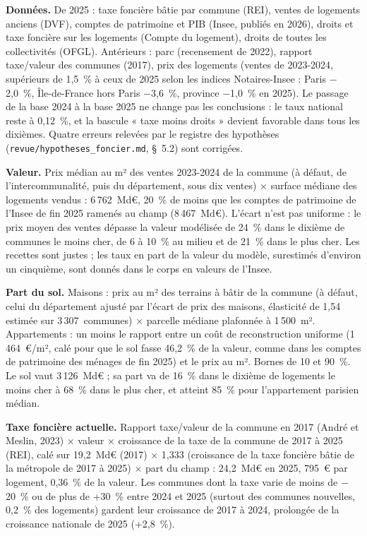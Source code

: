 \documentclass[11pt,a4paper]{article}
\begin{document}
\textbf{Données.} De 2025 : taxe foncière bâtie par commune (REI), ventes de logements anciens (DVF), comptes de
patrimoine et PIB (Insee, publiés en 2026), droits et taxe foncière sur les logements (Compte du logement), droits de
toutes les collectivités (OFGL). Antérieurs : parc (recensement de 2022), rapport taxe/valeur des communes (2017), prix
des logements (ventes de 2023-2024, supérieurs de 1,5~\% à ceux de 2025 selon les indices Notaires-Insee : Paris
$-$2,0~\%, Île-de-France hors Paris $-$3,6~\%, province $-$1,0~\% en 2025). Le passage de la base 2024 à la base 2025 ne
change pas les conclusions : le taux national reste à 0,12~\%, et la bascule « taxe moins droits » devient favorable dans
tous les dixièmes. Quatre erreurs relevées par le registre des hypothèses (\texttt{revue/hypotheses\_foncier.md},
§~5.2) sont corrigées.

\textbf{Valeur.} Prix médian au m² des ventes 2023-2024 de la commune (à défaut, de l'intercommunalité, puis du
département, sous dix ventes) × surface médiane des logements vendus : 6\,762~Md€, 20~\% de moins que les comptes de
patrimoine de l'Insee de fin 2025 ramenés au champ (8\,467~Md€). L'écart n'est pas uniforme : le prix moyen des ventes
dépasse la valeur modélisée de 24~\% dans le dixième de communes le moins cher, de 6 à 10~\% au milieu et de 21~\% dans le
plus cher. Les recettes sont justes ; les taux en part de la valeur du modèle, surestimés d'environ un cinquième, sont
donnés dans le corps en valeurs de l'Insee.

\textbf{Part du sol.} Maisons : prix au m² des terrains à bâtir de la commune (à défaut, celui du département ajusté par
l'écart de prix des maisons, élasticité de 1,54 estimée sur 3\,307~communes) × parcelle médiane plafonnée à 1\,500~m².
Appartements : un moins le rapport entre un coût de reconstruction uniforme (1\,464~€/m², calé pour que le sol fasse
46,2~\% de la valeur, comme dans les comptes de patrimoine des ménages de fin 2025) et le prix au m². Bornes de 10 et
90~\%. Le sol vaut 3\,126~Md€ ; sa part va de 16~\% dans le dixième de logements le moins cher à 68~\% dans le plus cher,
et atteint 85~\% pour l'appartement parisien médian.

\textbf{Taxe foncière actuelle.} Rapport taxe/valeur de la commune en 2017 (André et Meslin, 2023) × valeur × croissance
de la taxe de la commune de 2017 à 2025 (REI), calé sur 19,2~Md€ (2017) × 1,333 (croissance de la taxe foncière bâtie de
la métropole de 2017 à 2025) × part du champ : 24,2~Md€ en 2025, 795~€ par logement, 0,36~\% de la valeur. Les communes
dont la taxe varie de moins de $-$20~\% ou de plus de +30~\% entre 2024 et 2025 (surtout des communes nouvelles,
0,2~\% des logements) gardent leur croissance de 2017 à 2024, prolongée de la croissance nationale de 2025 (+2,8~\%).
\end{document}
